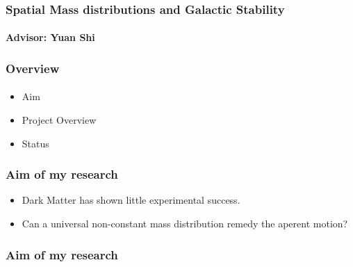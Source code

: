 \documentclass[18pt]{beamer}
\begin{document}
\begin{frame}
    \frametitle{Spatial Mass distributions and Galactic Stability}
    \framesubtitle{Advisor: Yuan Shi}
\end{frame}








\begin{frame}
    \frametitle{Overview}
    \framesubtitle{}
    \begin{itemize}
        \item Aim
        \item Project Overview
        \item Status
    \end{itemize}
\end{frame}








\begin{frame}
    \frametitle{Aim of my research}
    \begin{itemize}
        \item Dark Matter has shown little experimental success.
        \item Can a universal non-constant mass distribution remedy the aperent motion?
    \end{itemize}

\end{frame}







\begin{frame}
    \frametitle{Aim of my research}
    \begin{figure}[h]
        \centering
    \end{figure}
\end{frame}
\end{document}

